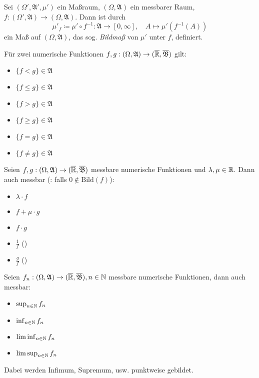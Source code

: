 \documentclass{cheat-sheet}
\newcommand{\Alg}{\mathfrak{A}} %
\newcommand{\Bor}{\mathfrak{B}} %
\begin{document}
\begin{defn}
  Sei $(\Omega', \Alg', \mu')$ ein Maßraum, $(\Omega, \Alg)$ ein messbarer Raum, $f : (\Omega', \Alg) \to (\Omega, \Alg)$. Dann ist durch
  \[ \mu'_f \coloneqq \mu' \circ f^{-1} : \Alg \to [0, \infty], \quad A \mapsto \mu'(f^{-1}(A)) \]
  ein Maß auf $(\Omega, \Alg)$, das sog. \emph{Bildmaß} von $\mu'$ unter $f$, definiert.
\end{defn}

\begin{satz}
  Für zwei numerische Funktionen $f, g : (\Omega, \Alg) \to (\ER, \overline{\Bor})$ gilt:
  \begin{multicols}{3}
    \begin{itemize}
      \item $\{ f < g \} \in \Alg$
      \item $\{ f \leq g \} \in \Alg$
      \item $\{ f > g \} \in \Alg$
      \item $\{ f \geq g \} \in \Alg$
      \item $\{ f = g \} \in \Alg$
      \item $\{ f \not= g \} \in \Alg$
    \end{itemize}
  \end{multicols}
\end{satz}

\begin{satz}
  Seien $f, g : (\Omega, \Alg) \to (\ER, \overline{\Bor})$ messbare numerische Funktionen und $\lambda, \mu \in \mathbb{R}$. Dann auch messbar (\ddag: falls $0 \not\in \mathrm{Bild}(f)$):
  \begin{multicols}{5}
    \begin{itemize}
      \item $\lambda \cdot f$
      \item $f + \mu \cdot g$
      \item $f \cdot g$
      \item $\tfrac{1}{f}$ (\ddag)
      \item $\tfrac{g}{f}$ (\ddag)
    \end{itemize}
  \end{multicols}
\end{satz}

\begin{satz}
  Seien $f_n : (\Omega, \Alg) \to (\ER, \overline{\Bor}), n \in \N$ messbare numerische Funktionen, dann auch messbar:
  \begin{multicols}{4}
    \begin{itemize}
      \item $\sup_{n \in \mathbb{N}} f_n$
      \item $\inf_{n \in \mathbb{N}} f_n$
      \item $\liminf_{n \in \mathbb{N}} f_n$
      \item $\limsup_{n \in \mathbb{N}} f_n$
    \end{itemize}
  \end{multicols}
  \vspace{4pt}
  Dabei werden Infimum, Supremum, usw. punktweise gebildet.
\end{satz}
\end{document}
